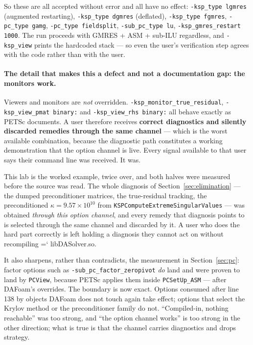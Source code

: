 \documentclass[11pt,a4paper]{article}
\newcommand{\artifact}[1]{{\small\ttfamily\hyphenchar\font=`\-\relax
  \def\_{\textunderscore\allowbreak}#1}}
\begin{document}
So these are all accepted without error and all have no effect:
\texttt{-ksp\_type lgmres} (augmented restarting), \texttt{-ksp\_type dgmres} (deflated),
\texttt{-ksp\_type fgmres}, \texttt{-pc\_type gamg}, \texttt{-pc\_type fieldsplit},
\texttt{-sub\_pc\_type lu}, \texttt{-ksp\_gmres\_restart 1000}. The run proceeds with
GMRES + ASM + sub-ILU regardless, and \texttt{-ksp\_view} prints the hardcoded stack --- so even
the user's verification step agrees with the code rather than with the user.

\paragraph{The detail that makes this a defect and not a documentation gap: the monitors work.}
Viewers and monitors are \emph{not} overridden. \texttt{-ksp\_monitor\_true\_residual},
\texttt{-ksp\_view\_pmat binary:} and \texttt{-ksp\_view\_rhs binary:} all behave exactly as
PETSc documents. A user therefore receives \textbf{correct diagnostics and silently discarded
remedies through the same channel} --- which is the worst available combination, because the
diagnostic path constitutes a working demonstration that the option channel is live. Every
signal available to that user says their command line was received. It was.

This lab is the worked example, twice over, and both halves were measured before the source was
read. The whole diagnosis of Section~\ref{sec:elimination} --- the dumped preconditioner
matrices, the true-residual tracking, the preconditioned \(\kappa=9.57\times10^{10}\) from
\texttt{KSPComputeExtremeSingularValues} --- was obtained \emph{through this option channel},
and every remedy that diagnosis points to is selected through the same channel and discarded by
it. A user who does the hard part correctly is left holding a diagnosis they cannot act on
without recompiling \artifact{libDASolver.so}.

It also sharpens, rather than contradicts, the measurement in
Section~\ref{sec:pc}: factor options such as \texttt{-sub\_pc\_factor\_zeropivot} \emph{do} land
and were proven to land by \texttt{PCView}, because PETSc applies them inside
\texttt{PCSetUp\_ASM} --- after DAFoam's overrides. The boundary is now exact. Options consumed
after line 138 by objects DAFoam does not touch again take effect; options that select the
Krylov method or the preconditioner family do not. ``Compiled-in, nothing reachable'' was too
strong, and ``the option channel works'' is too strong in the other direction; what is true is
that the channel carries diagnostics and drops strategy.
\end{document}
